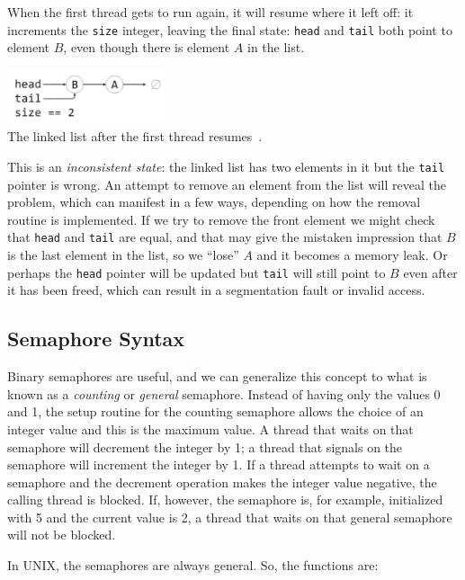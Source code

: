 \documentclass[a4paper]{report}
\begin{document}
\begin{appendices}
When the first thread gets to run again, it will resume where it left off: it increments the \texttt{size} integer, leaving the final state: \texttt{head} and \texttt{tail} both point to element $B$, even though there is element $A$ in the list.

\begin{center}
\includegraphics[width=0.35\textwidth]{images/linkedlist3.png}\\
The linked list after the first thread resumes~\cite{mte241}.
\end{center}

This is an \textit{inconsistent state}: the linked list has two elements in it but the \texttt{tail} pointer is wrong. An attempt to remove an element from the list will reveal the problem, which can manifest in a few ways, depending on how the removal routine is implemented. If we try to remove the front element we might check that \texttt{head} and \texttt{tail} are equal, and that may give the mistaken impression that $B$ is the last element in the list, so we ``lose'' $A$ and it becomes a memory leak. Or perhaps the \texttt{head} pointer will be updated but \texttt{tail} will still point to $B$ even after it has been freed, which can result in a segmentation fault or invalid access.

\subsection*{Semaphore Syntax}

Binary semaphores are useful, and we can generalize this concept to what is known as a \textit{counting} or \textit{general} semaphore. Instead of having only the values 0 and 1, the setup routine for the counting semaphore allows the choice of an integer value and this is the maximum value. A thread that waits on that semaphore will decrement the integer by 1; a thread that signals on the semaphore will increment the integer by 1. If a thread attempts to wait on a semaphore and the decrement operation makes the integer value negative, the calling thread is blocked. If, however, the semaphore is, for example, initialized with 5 and the current value is 2, a thread that waits on that general semaphore will not be blocked.

In UNIX, the semaphores are always general. So, the functions are:


\end{appendices}
\end{document}
